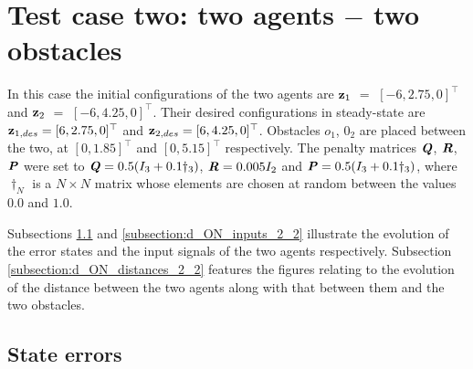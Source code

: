 \section{Test case two: two agents $-$ two obstacles}

In this case the initial configurations of the two agents are
$\bm{\mathbf{z}}_1$ $=$ $[-6, 2.75, 0]^{\top}$ and
$\bm{\mathbf{z}}_2$ $=$ $[-6, 4.25, 0]^{\top}$.
Their desired configurations in steady-state are
$\bm{\mathbf{z}}_{1,des} = [6, 2.75, 0]^{\top}$ and
$\bm{\mathbf{z}}_{2,des} = [6, 4.25, 0]^{\top}$.
Obstacles $o_1$, $0_2$ are placed between the two, at $[0, 1.85]^{\top}$
and $[0, 5.15]^{\top}$ respectively. The penalty
matrices $\bm{\mathit{Q}}$, $\bm{\mathit{R}}$, $\bm{\mathit{P}}$ were set to
$\bm{\mathit{Q}} = 0.5 (I_3 + 0.1 \dagger_3)$, $\bm{\mathit{R}} = 0.005 I_2$ and
$\bm{\mathit{P}} = 0.5 (I_3 + 0.1 \dagger_3)$, where $\dagger_N$ is a $N \times N$
matrix whose elements are chosen at random between the values $0.0$ and $1.0$.

Subsections \ref{subsection:d_ON_errors_2_2} and
\ref{subsection:d_ON_inputs_2_2} illustrate the evolution of the error states
and the input signals of the two agents respectively. Subsection
\ref{subsection:d_ON_distances_2_2} features the figures relating to the
evolution of the distance between the two agents along with that between them
and the two obstacles.


\subsection{State errors}
\label{subsection:d_ON_errors_2_2}

\noindent{}


